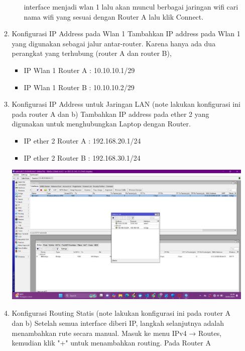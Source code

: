 \begin{enumerate}
\begin{enumerate}
\begin{itemize}
            interface menjadi wlan 1 lalu akan muncul berbagai 
            jaringan wifi cari nama wifi yang sesuai dengan 
            Router A lalu klik Connect.
        \end{itemize}
        \item Konfigurasi IP Address pada Wlan 1 Tambahkan IP 
        address pada Wlan 1 yang digunakan sebagai jalur 
        antar-router. Karena hanya ada dua perangkat yang 
        terhubung (router A dan router B),
        \begin{itemize}
            \item IP Wlan 1 Router A : 10.10.10.1/29
            \item IP Wlan 1 Router B : 10.10.10.2/29
        \end{itemize}
        \item Konfigurasi IP Address untuk Jaringan LAN (note 
        lakukan konfigurasi ini pada router A dan b) Tambahkan 
        IP address pada ether 2 yang digunakan untuk 
        menghubungkan Laptop dengan Router.
        \begin{itemize}
            \item IP ether 2 Router A : 192.168.20.1/24
            \item IP ether 2 Router B : 192.168.30.1/24 \newline
        \end{itemize}
        \includegraphics[scale=0.4]{P1/img/3.jpg} \newline
        \item Konfigurasi Routing Statis (note lakukan konfigurasi ini pada router A dan b) Setelah semua interface diberi IP, langkah selanjutnya adalah menambahkan rute secara manual. Masuk ke menu IPv4 → Routes, kemudian klik "+" untuk menambahkan routing. Pada Router A
        \begin{itemize}

\end{itemize}
\end{enumerate}
\end{enumerate}
